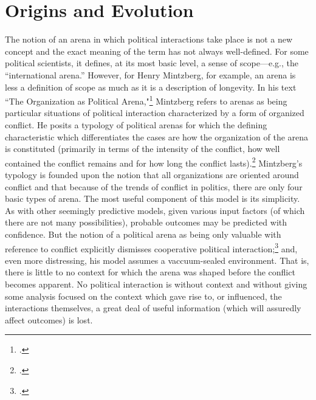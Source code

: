\documentclass[letterpaper,12pt]{article}
\begin{document}
\section{Origins and Evolution}
The notion of an arena in which political interactions take place is not a new concept and the exact meaning of the term has not always well-defined. 
For some political scientists, it defines, at its most basic level, a sense of scope---e.g., the ``international arena.'' 
However, for Henry Mintzberg, for example, an arena is less a definition of scope as much as it is a description of longevity. 
In his text ``The Organization as Political Arena,"\footcite{mintzberg85} Mintzberg refers to arenas as being particular situations of political interaction characterized by a form of organized conflict. 
He posits a typology of political arenas for which the defining characteristic which differentiates the cases are how the organization of the arena is constituted (primarily in terms of the intensity of the conflict, how well contained the conflict remains and for how long the conflict lasts).\footcite[141]{mintzberg85} 
Mintzberg's typology is founded upon the notion that all organizations are oriented around conflict and that because of the trends of conflict in politics, there are only four basic types of arena. 
The most useful component of this model is its simplicity. 
As with other seemingly predictive models, given various input factors (of which there are not many possibilities), probable outcomes may be predicted with confidence. 
But the notion of a political arena as being only valuable with reference to conflict explicitly dismisses cooperative political interaction;\footcite[152]{mintzberg85} and, even more distressing, his model assumes a vaccuum-sealed environment. 
That is, there is little to no context for which the arena was shaped before the conflict becomes apparent. 
No political interaction is without context and without giving some analysis focused on the context which gave rise to, or influenced, the interactions themselves, a great deal of useful information (which will assuredly affect outcomes) is lost.
\end{document}
